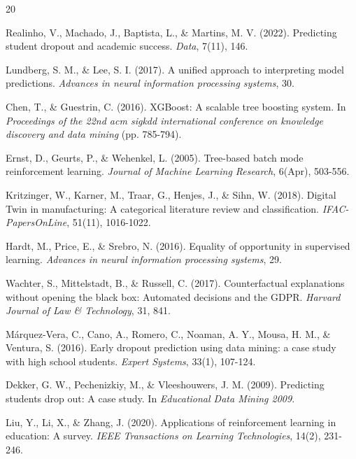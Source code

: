 \documentclass[12pt,a4paper]{report}
\begin{document}
\newpage
{}
\begin{thebibliography}{20}

Realinho, V., Machado, J., Baptista, L., \& Martins, M. V. (2022). Predicting student dropout and academic success. \textit{Data}, 7(11), 146.

Lundberg, S. M., \& Lee, S. I. (2017). A unified approach to interpreting model predictions. \textit{Advances in neural information processing systems}, 30.

Chen, T., \& Guestrin, C. (2016). XGBoost: A scalable tree boosting system. In \textit{Proceedings of the 22nd acm sigkdd international conference on knowledge discovery and data mining} (pp. 785-794).

Ernst, D., Geurts, P., \& Wehenkel, L. (2005). Tree-based batch mode reinforcement learning. \textit{Journal of Machine Learning Research}, 6(Apr), 503-556.

Kritzinger, W., Karner, M., Traar, G., Henjes, J., \& Sihn, W. (2018). Digital Twin in manufacturing: A categorical literature review and classification. \textit{IFAC-PapersOnLine}, 51(11), 1016-1022.

Hardt, M., Price, E., \& Srebro, N. (2016). Equality of opportunity in supervised learning. \textit{Advances in neural information processing systems}, 29.

Wachter, S., Mittelstadt, B., \& Russell, C. (2017). Counterfactual explanations without opening the black box: Automated decisions and the GDPR. \textit{Harvard Journal of Law \& Technology}, 31, 841.

Márquez-Vera, C., Cano, A., Romero, C., Noaman, A. Y., Mousa, H. M., \& Ventura, S. (2016). Early dropout prediction using data mining: a case study with high school students. \textit{Expert Systems}, 33(1), 107-124.

Dekker, G. W., Pechenizkiy, M., \& Vleeshouwers, J. M. (2009). Predicting students drop out: A case study. In \textit{Educational Data Mining 2009}.

Liu, Y., Li, X., \& Zhang, J. (2020). Applications of reinforcement learning in education: A survey. \textit{IEEE Transactions on Learning Technologies}, 14(2), 231-246.


\end{thebibliography}
\end{document}
